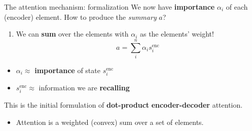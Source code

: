 \documentclass[12pt,aspectratio=169,handout]{beamer}
\newcounter{saveenumi}
\newcommand{\conti}{\setcounter{enumi}{\value{saveenumi}}}
\begin{document}
\begin{frame}{The attention mechanism: formalization}
	We now have \textbf{importance} $\alpha_i$ of each (encoder) element. How to produce the \textit{summary} $a$?

	\begin{enumerate}
		\conti
		\item We can \textbf{sum} over the elements with $\alpha_i$ as the elements' weight!
		$$
			a = \sum_i^n \alpha_i s_i^{\text{enc}}
		$$

	\end{enumerate}

\pause

\begin{itemize}
	\item $\alpha_i \approx $ \textbf{importance} of state $s_i^{\text{enc}}$   
	\item $s_i^{\text{enc}} \approx $ information we are \textbf{recalling} 
\end{itemize}

\pause

This is the initial formulation of \textbf{dot-product} \textbf{encoder-decoder} attention.
\pause
\begin{itemize}
	\item Attention is a weighted (convex) sum over a set of elements.
\end{itemize}
	
\end{frame}
\end{document}
